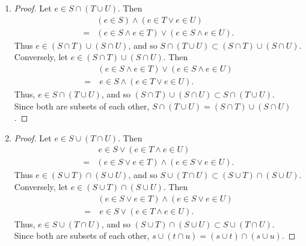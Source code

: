 \documentclass{homework}
\begin{document}
\begin{solution}
\begin{enumerate}[label=(\alph*)]
  \item
    \begin{proof}[Proof]
      Let $e\in S\cap \left( T\cup U \right) $. Then
      \begin{align*}
        &\left( e\in S \right) \land \left( e\in T \lor e\in U \right) \\
        = &\left( e\in S\land e\in T \right) \lor \left( e\in S\land e\in U \right)
      .\end{align*}
      Thus $e\in \left( S\cap T \right) \cup \left( S\cap U \right)$, and so $S\cap \left( T\cup U 
        \right) \subset \left( S\cap T \right) \cup \left( S\cap U \right) $.\\
      Conversely, let $e\in \left( S\cap T \right) \cup \left( S\cap U \right)$. Then
      \begin{align*}
        &\left( e\in S\land e\in T \right) \lor \left( e\in S\land e\in U \right) \\
        = &~e\in S\land \left(e\in T\lor e\in U\right)
      .\end{align*}
      Thus, $e\in S\cap \left( T\cup U \right)$, and so $\left( S\cap T
      \right) \cup \left( S\cap U \right) \subset S\cap \left( T\cup U \right) $. \\
      Since both are subsets of each other, $S\cap \left( T\cup U \right) = \left( S\cap T
      \right)\cup \left( S\cap U \right) $.
    \end{proof}
    
  \item
    \begin{proof}[Proof]
      Let $e\in S\cup \left( T\cap U \right)$. Then
      \begin{align*}
        &~e\in S\lor \left( e\in T\land e\in U \right) \\
        = &\left( e\in S\lor e\in T \right) \land \left( e\in S\lor e\in U \right)
      .\end{align*}
      Thus $e\in \left( S\cup T \right) \cap \left( S\cup U \right)$, and so $S\cup \left( T\cap U
        \right) \subset \left( S\cup T \right) \cap \left( S\cup U \right) $. \\
        Conversely, let $e\in \left( S\cup T \right) \cap \left( S\cup U \right)$. Then 
        \begin{align*}
          &\left( e\in S\lor e\in T \right) \land \left( e\in S\lor e\in U \right) \\
          =&~e\in S\lor \left( e\in T\land e\in U \right)
        .\end{align*}
      Thus, $e\in S\cup \left( T\cap U \right)$, and so $\left( S\cup T \right) \cap \left( S\cup U 
      \right) \subset S\cup \left( T\cap U \right) $.\\
      Since both are subsets of each other, $s\cup \left( t\cap u \right) = \left( s\cup t \right)
      \cap \left( s\cup u \right).$
    \end{proof}


\end{enumerate}
\end{solution}
\end{document}
